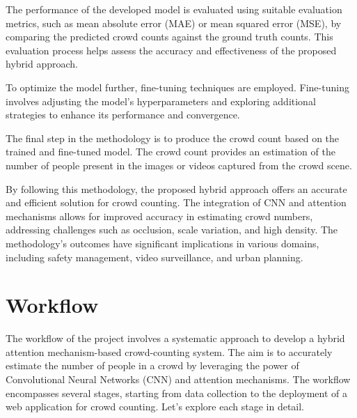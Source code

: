 \documentclass[12pt]{report}
\begin{document}
The performance of the developed model is evaluated using suitable evaluation metrics, such as mean absolute error (MAE) or mean squared error (MSE), by comparing the predicted crowd counts against the ground truth counts. This evaluation process helps assess the accuracy and effectiveness of the proposed hybrid approach.
\newline

To optimize the model further, fine-tuning techniques are employed. Fine-tuning involves adjusting the model's hyperparameters and exploring additional strategies to enhance its performance and convergence.
\newline

The final step in the methodology is to produce the crowd count based on the trained and fine-tuned model. The crowd count provides an estimation of the number of people present in the images or videos captured from the crowd scene.
\newline

By following this methodology, the proposed hybrid approach offers an accurate and efficient solution for crowd counting. The integration of CNN and attention mechanisms allows for improved accuracy in estimating crowd numbers, addressing challenges such as occlusion, scale variation, and high density. The methodology's outcomes have significant implications in various domains, including safety management, video surveillance, and urban planning.
\newline



\section{Workflow}

The workflow of the project involves a systematic approach to develop a hybrid attention mechanism-based crowd-counting system. The aim is to accurately estimate the number of people in a crowd by leveraging the power of Convolutional Neural Networks (CNN) and attention mechanisms. The workflow encompasses several stages, starting from data collection to the deployment of a web application for crowd counting. Let's explore each stage in detail.
\newline
\end{document}
